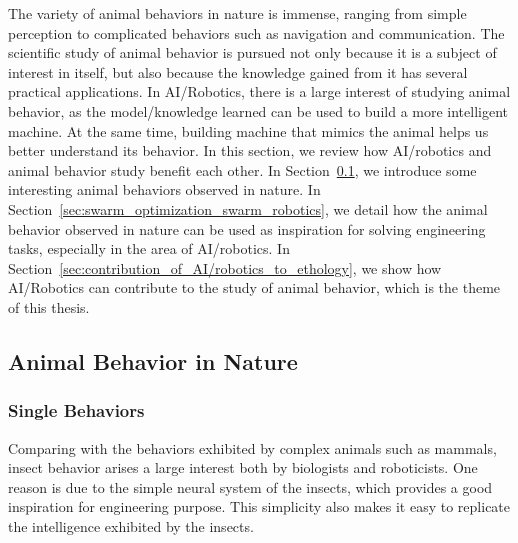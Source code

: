 The variety of animal behaviors in nature is immense, ranging from simple perception to complicated behaviors such as navigation and communication. The scientific study of animal behavior is pursued not only because it is a subject of interest in itself, but also because the knowledge gained from it has several practical applications. In AI/Robotics, there is a large interest of studying animal behavior, as the model/knowledge learned can be used to build a more intelligent machine. At the same time, building machine that mimics the animal helps us better understand its behavior. In this section, we review how AI/robotics and animal behavior study benefit each other. In Section~\ref{sec:animal_behavior_in_nature}, we introduce some interesting animal behaviors observed in nature. In Section~\ref{sec:swarm_optimization_swarm_robotics}, we detail how the animal behavior observed in nature can be used as inspiration for solving engineering tasks, especially in the area of AI/robotics. In Section~\ref{sec:contribution_of_AI/robotics_to_ethology}, we show how AI/Robotics can contribute to the study of animal behavior, which is the theme of this thesis.

\subsection{Animal Behavior in Nature}\label{sec:animal_behavior_in_nature}

\subsubsection{Single Behaviors}

Comparing with the behaviors exhibited by complex animals such as mammals, insect behavior arises a large interest both by biologists and roboticists. One reason is due to the simple neural system of the insects, which provides a good inspiration for engineering purpose. This simplicity also makes it easy to replicate the intelligence exhibited by the insects. 

